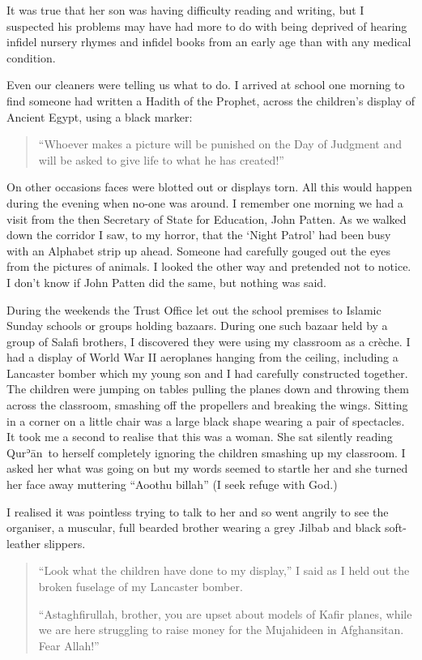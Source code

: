 \documentclass[12pt]{memoir}
\def\´{ʾ} %
\newcommand{\cor}[2]{#2} %
\def \Quran{Qur\-\´ān} %
\begin{document}
It was true that her son was having difficulty reading and writing,
but I suspected his problems may have had more to do with being deprived of
hearing infidel nursery rhymes and infidel books
from an early age than with any medical condition.

Even our cleaners were telling us what to do.
I arrived at school one morning to find someone
had written a Hadith of the Prophet,
across the children’s display of Ancient Egypt, using a black marker:

\begin{quote}
“Whoever makes a picture will be punished on the Day of Judgment
and will be asked to give life to what he has created!”
\end{quote}

On other occasions faces were blotted out or displays torn.
All this would happen during the evening when no-one was around.
I remember one morning we had a visit
from the then Secretary of State for Education, John Patten.
As we walked down the corridor I saw, to my horror,
that the ‘Night Patrol’ had been busy with an Alphabet strip up ahead.
Someone had carefully gouged out the eyes from the pictures of animals.
I looked the other way and pretended not to notice.
I don’t know if John Patten did the same, but nothing was said.

During the weekends the Trust Office let out the school premises
to Islamic Sunday schools or groups holding bazaars.
During one such bazaar held by a group of Salafi brothers,
I discovered they were using my classroom as a crèche.
I had a display of World War II aeroplanes hanging from the ceiling,
including a Lancaster \cor{Bomber}{bomber} which my young son and I
had carefully constructed together.
The children were jumping on tables pulling the planes down
and throwing them across the classroom,
smashing off the propellers and breaking the wings.
Sitting in a corner on a little chair was a large black shape
wearing a pair of spectacles.
It took me a second to realise that this was a woman.
She sat silently reading \Quran\ to herself
completely ignoring the children smashing up my classroom.
I asked her what was going on but my words seemed
to startle her and she turned her face away
muttering “Aoothu billah” (I seek refuge with God.)

I realised it was pointless trying to talk to her
and so went angrily to see the organiser, a muscular,
full bearded brother wearing a grey Jilbab and black soft-leather slippers.

\begin{quote}
“Look what the children have done to my display,”
I said as I held out the broken fuselage of my Lancaster bomber.

“Astaghfirullah, brother, you are upset about models of Kafir planes,
while we are here struggling to raise money for the Mujahideen in Afghansitan.
Fear Allah!”
\end{quote}
\end{document}
